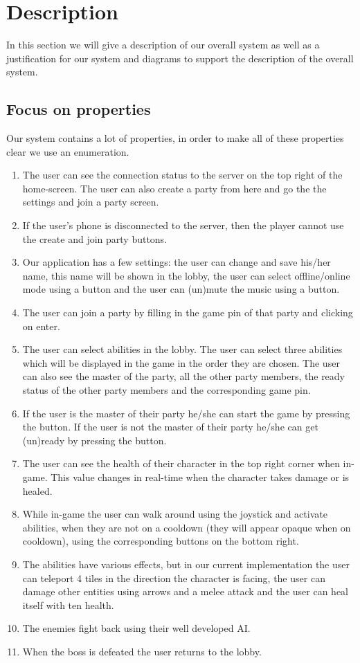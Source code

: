 \documentclass[../main.tex]{subfiles}
\begin{document}
\pagebreak

\section{Description}
In this section we will give a description of our overall system as well as a justification for our system and diagrams to support the description of the overall system.

    \subsection{Focus on properties}
	Our system contains a lot of properties, in order to make all of these properties clear we use an enumeration.
	\begin{enumerate}
		\item The user can see the connection status to the server on the top right of the home-screen. The user can also create a party from here and go the the settings and join a party screen.
		\item If the user's phone is disconnected to the server, then the player cannot use the create and join party buttons.
		\item Our application has a few settings: the user can change and save his/her name, this name will be shown in the lobby, the user can select offline/online mode using a button and the user can (un)mute the music using a button.
		\item The user can join a party by filling in the game pin of that party and clicking on enter.
		\item The user can select abilities in the lobby. The user can select three abilities which will be displayed in the game in the order they are chosen. The user can also see the master of the party, all the other party members, the ready status of the other party members and the corresponding game pin.
		\item If the user is the master of their party he/she can start the game by pressing the button. If the user is not the master of their party he/she can get (un)ready by pressing the button.
		\item The user can see the health of their character in the top right corner when in-game. This value changes in real-time when the character takes damage or is healed.
		\item While in-game the user can walk around using the joystick and activate abilities, when they are not on a cooldown (they will appear opaque when on cooldown), using the corresponding buttons on the bottom right. 
		\item The abilities have various effects, but in our current implementation the user can teleport 4 tiles in the direction the character is facing, the user can damage other entities using arrows and a melee attack and the user can heal itself with ten health.
		\item The enemies fight back using their well developed AI.
		\item When the boss is defeated the user returns to the lobby.
    \end{enumerate}
\end{document}
